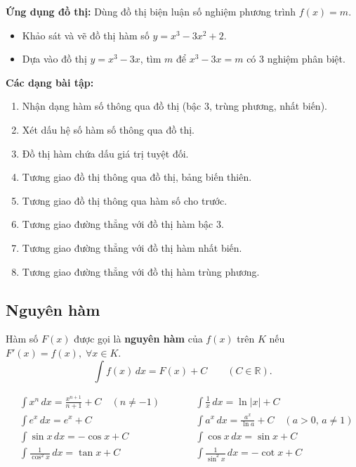 \documentclass[12pt,a4paper]{article}
\begin{document}
\begin{luuy}
  \textbf{Ứng dụng đồ thị:} Dùng đồ thị biện luận số nghiệm phương trình $f(x) = m$.
\end{luuy}

\begin{vidu}
  \begin{itemize}
    \item Khảo sát và vẽ đồ thị hàm số $y = x^3 - 3x^2 + 2$.
    \item Dựa vào đồ thị $y = x^3 - 3x$, tìm $m$ để $x^3 - 3x = m$ có 3 nghiệm phân biệt.
  \end{itemize}
\end{vidu}

\medskip\noindent\textbf{Các dạng bài tập:}
\begin{enumerate}[label=\textbf{Dạng \arabic*:}, leftmargin=*, align=left]
  \item Nhận dạng hàm số thông qua đồ thị (bậc 3, trùng phương, nhất biến).
  \item Xét dấu hệ số hàm số thông qua đồ thị.
  \item Đồ thị hàm chứa dấu giá trị tuyệt đối.
  \item Tương giao đồ thị thông qua đồ thị, bảng biến thiên.
  \item Tương giao đồ thị thông qua hàm số cho trước.
  \item Tương giao đường thẳng với đồ thị hàm bậc 3.
  \item Tương giao đường thẳng với đồ thị hàm nhất biến.
  \item Tương giao đường thẳng với đồ thị hàm trùng phương.
\end{enumerate}

\subsection{Nguyên hàm}

\begin{dinhnghia}
  Hàm số $F(x)$ được gọi là \textbf{nguyên hàm} của $f(x)$ trên $K$ nếu $F'(x) = f(x),\;\forall x \in K$.
  \[
    \int f(x)\,dx = F(x) + C \qquad (C \in \mathbb{R}).
  \]
\end{dinhnghia}

\begin{congthuc}[title={Bảng nguyên hàm cơ bản}]
  \begin{align*}
    &\int x^n\,dx = \frac{x^{n+1}}{n+1} + C \quad (n \ne -1)
    &\qquad&
    \int \frac{1}{x}\,dx = \ln|x| + C \\[6pt]
    &\int e^x\,dx = e^x + C
    &&
    \int a^x\,dx = \frac{a^x}{\ln a} + C \quad (a > 0,\, a \ne 1) \\[6pt]
    &\int \sin x\,dx = -\cos x + C
    &&
    \int \cos x\,dx = \sin x + C \\[6pt]
    &\int \frac{1}{\cos^2 x}\,dx = \tan x + C
    &&
    \int \frac{1}{\sin^2 x}\,dx = -\cot x + C
  \end{align*}
\end{congthuc}
\end{document}
